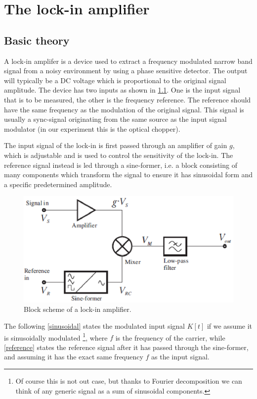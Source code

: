 \chapter{The lock-in amplifier}\label{lokkin}
	\section{Basic theory}

A lock-in amplifer is a device used to extract a frequency modulated narrow band signal from a noisy environment by using a phase sensitive detector. The output will typically be a DC voltage which is proportional to the original signal amplitude. The device has two inputs as shown in \cref{lockin1}. One is the input signal that is to be measured, the other is the frequency reference. The reference should have the same frequency as the modulation of the original signal. This signal is usually a sync-signal originating from the same source as the input signal modulator (in our experiment this is the optical chopper). 

The input signal of the lock-in is first passed through an amplifier of gain $g$, which is adjustable and is used to control the sensitivity of the lock-in. The reference signal instead is led through a sine-former, i.e.  a block consisting of many components which transform the signal to ensure it has sinusoidal form and a specific predetermined amplitude.

\begin{figure}[!hbt]\centering
\includegraphics[width=\linewidth, draft=\foto]{eps/lockin1.eps}
\caption{Block scheme of a lock-in amplifier.}
\label{lockin1}
\end{figure}

The following \cref{sinusoidal} states the  modulated input signal $K[t]$ if we assume it is sinusoidally modulated \footnote{Of course this is not out case, but thanks to Fourier decomposition we can think of any generic signal as a sum of sinusoidal components.}, where $f$ is the frequency of the carrier, while \cref{reference} states the reference signal after it has passed through the sine-former, and assuming it has the exact same frequency $f$ as the input signal.

